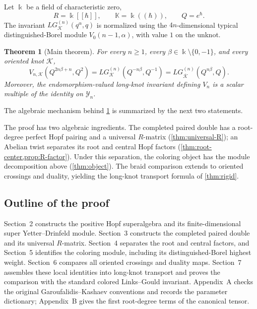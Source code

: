 \documentclass[11pt,a4paper]{article}
\newcommand{\kk}{\Bbbk}
\newcommand{\hK}{\mathbb K}
\newtheorem{theorem}{Theorem}[section]
\theoremstyle{definition}
\theoremstyle{remark}
\begin{document}
Let \(\kk\) be a field of characteristic zero,
\[
 R=\kk[[\hbar]],\qquad \hK=\kk((\hbar)),\qquad Q=e^\hbar.
\]
The invariant \(LG_{\mathcal K}^{(n)}(q^\alpha,q)\) is normalized using the
\(4n\)-dimensional typical distinguished-Borel module
\(V_0(n-1,\alpha)\), with value \(1\) on the unknot.

\begin{theorem}[Main theorem]\label{thm:main}
For every \(n\geq 1\), every \(\beta\in\kk\setminus\{0,-1\}\), and every
oriented knot \(\mathcal K\),
\begin{equation}\label{eq:main}
 V_{n,\mathcal K}\!\left(Q^{2n\beta+n},Q^2\right)
 =
 LG_{\mathcal K}^{(n)}\!\left(Q^{-n\beta},Q^{-1}\right)
 =
 LG_{\overline{\mathcal K}}^{(n)}\!\left(Q^{n\beta},Q\right).
\end{equation}
Moreover, the endomorphism-valued long-knot invariant defining \(V_n\)
is a scalar multiple of the identity on \(\mathcal Y_n\).
\end{theorem}

The algebraic mechanism behind \cref{thm:main} is summarized by the next
two statements.

The proof has two algebraic ingredients.  The completed paired double
has a root-degree perfect Hopf pairing and a universal \(R\)-matrix
(\cref{thm:universal-R}); an Abelian twist separates its root and central
Hopf factors (\cref{thm:root-center,prop:R-factor}).  Under this
separation, the coloring object has the module decomposition above
(\cref{thm:object}).  The braid comparison extends to oriented crossings
and duality, yielding the long-knot transport formula of \cref{thm:rigid}.

\subsection{Outline of the proof}

Section~2 constructs the positive Hopf superalgebra and its finite-dimensional
super Yetter--Drinfeld module.  Section~3 constructs the completed paired
double and its universal \(R\)-matrix.  Section~4 separates the root and
central factors, and Section~5 identifies the coloring module, including
its distinguished-Borel highest weight.  Section~6 compares all oriented
crossings and duality maps.  Section~7 assembles these local identities
into long-knot transport and proves the comparison with the standard
colored Links--Gould invariant.  Appendix~A checks the original
Garoufalidis--Kashaev conventions and records the parameter dictionary;
Appendix~B gives the first root-degree terms of the canonical tensor.
\end{document}
